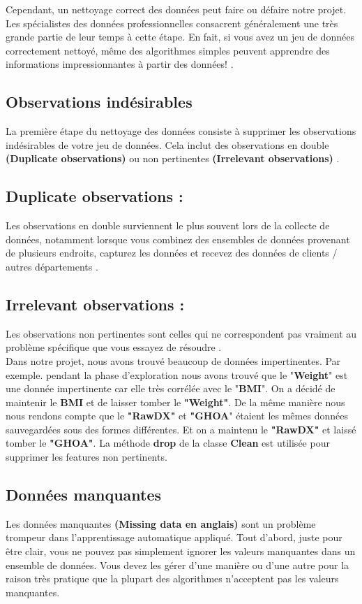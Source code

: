 \documentclass[12pt, french]{report}
\begin{document}
Cependant, un nettoyage correct des données peut faire ou défaire notre projet. Les spécialistes des données professionnelles consacrent généralement une très grande partie de leur temps à cette étape. En fait, si vous avez un jeu de données correctement nettoyé, même des algorithmes simples peuvent apprendre des informations impressionnantes à partir des données! \cite{key21}.

\subsection{Observations indésirables} La première étape du nettoyage des données consiste à supprimer les observations indésirables de votre jeu de données. Cela inclut des observations en double \textbf{(Duplicate observations)} ou non pertinentes \textbf{(Irrelevant observations)} \cite{key21}.

\subsection{Duplicate observations :} Les observations en double surviennent le plus souvent lors de la collecte de données, notamment lorsque vous combinez des ensembles de données provenant de plusieurs endroits, capturez les données et recevez des données de clients / autres départements \cite{key21}.

\subsection{Irrelevant observations :} Les observations non pertinentes sont celles qui ne correspondent pas vraiment au problème spécifique que vous essayez de résoudre \cite{key21}. \\

Dans notre projet, nous avons trouvé beaucoup de données impertinentes. Par exemple. pendant la phase d'exploration nous avons trouvé que le "\textbf{Weight}" est une donnée impertinente car elle très corrélée avec le "\textbf{BMI}". On a décidé de maintenir le \textbf{BMI} et de laisser tomber le \textbf{"Weight"}.  De la même manière nous nous rendons compte que le \textbf{"RawDX"} et \textbf{"GHOA}" étaient les mêmes données sauvegardées sous des formes différentes. Et on a maintenu le \textbf{"RawDX"} et laissé tomber le \textbf{"GHOA"}. La méthode \textbf{drop} de la classe \textbf{Clean} est utilisée pour supprimer les features non pertinents.  

\subsection{Données manquantes}
Les données manquantes \textbf{(Missing data en anglais)} sont un problème trompeur dans l'apprentissage automatique appliqué. Tout d'abord, juste pour être clair, vous ne pouvez pas simplement ignorer les valeurs manquantes dans un ensemble de données. Vous devez les gérer d'une manière ou d'une autre pour la raison très pratique que la plupart des algorithmes n'acceptent pas les valeurs manquantes.\\
\end{document}
